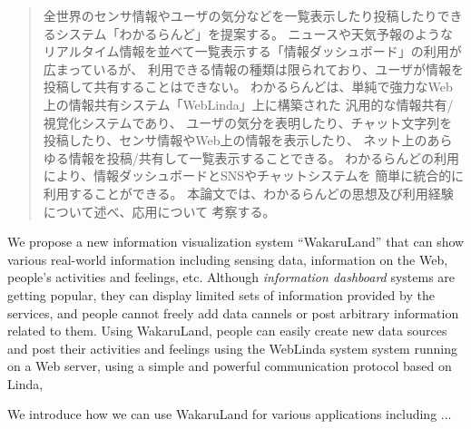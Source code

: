 \begin{abstract}
  全世界のセンサ情報やユーザの気分などを一覧表示したり投稿したりできるシステム「わかるらんど」を提案する。
  ニュースや天気予報のようなリアルタイム情報を並べて一覧表示する「情報ダッシュボード」の利用が広まっているが、
  利用できる情報の種類は限られており、ユーザが情報を投稿して共有することはできない。
  わかるらんどは、単純で強力なWeb上の情報共有システム「WebLinda」上に構築された
  汎用的な情報共有/視覚化システムであり、
  ユーザの気分を表明したり、チャット文字列を投稿したり、センサ情報やWeb上の情報を表示したり、
  ネット上のあらゆる情報を投稿/共有して一覧表示することできる。
  わかるらんどの利用により、情報ダッシュボードとSNSやチャットシステムを
  簡単に統合的に利用することができる。
  本論文では、わかるらんどの思想及び利用経験について述べ、応用について
  考察する。

\end{abstract}

\begin{eabstract}
  We propose a new information visualization system ``WakaruLand'' that can show
  various real-world information including sensing data, information on the Web,
  people's activities and feelings, etc.
  Although \textit{information dashboard} systems are getting popular,
  they can display limited sets of information provided by the services,
  and people cannot freely add data cannels or post arbitrary
  information related to them.
  Using WakaruLand, people can easily create new data sources and
  post their activities and feelings using the WebLinda system
  system running on a Web server,
  using a simple and powerful communication protocol based on Linda,
  
  We introduce how we can use WakaruLand for various applications
  including ...
\end{eabstract}

